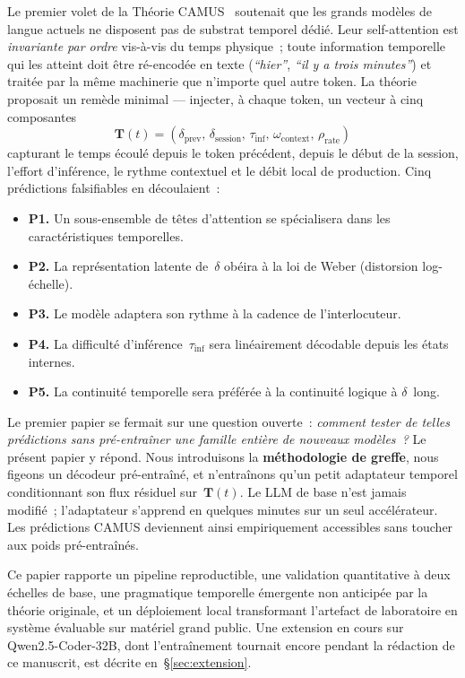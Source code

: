 \documentclass[10pt,twocolumn,letterpaper]{article}
\begin{document}
Le premier volet de la Théorie CAMUS~\cite{camus2026} soutenait que les grands modèles de langue actuels ne disposent pas de substrat temporel dédié. Leur self-attention est \emph{invariante par ordre} vis-à-vis du temps physique~; toute information temporelle qui les atteint doit être ré-encodée en texte (\emph{``hier''}, \emph{``il y a trois minutes''}) et traitée par la même machinerie que n'importe quel autre token. La théorie proposait un remède minimal --- injecter, à chaque token, un vecteur à cinq composantes
\[
\mathbf{T}(t) = (\delta_{\text{prev}},\, \delta_{\text{session}},\, \tau_{\text{inf}},\, \omega_{\text{context}},\, \rho_{\text{rate}})
\]
capturant le temps écoulé depuis le token précédent, depuis le début de la session, l'effort d'inférence, le rythme contextuel et le débit local de production. Cinq prédictions falsifiables en découlaient~:

\begin{itemize}[leftmargin=0.6cm, itemsep=1pt]
    \item \textbf{P1.} Un sous-ensemble de têtes d'attention se spécialisera dans les caractéristiques temporelles.
    \item \textbf{P2.} La représentation latente de~$\delta$ obéira à la loi de Weber (distorsion log-échelle).
    \item \textbf{P3.} Le modèle adaptera son rythme à la cadence de l'interlocuteur.
    \item \textbf{P4.} La difficulté d'inférence~$\tau_{\text{inf}}$ sera linéairement décodable depuis les états internes.
    \item \textbf{P5.} La continuité temporelle sera préférée à la continuité logique à $\delta$~long.
\end{itemize}

Le premier papier se fermait sur une question ouverte~: \emph{comment tester de telles prédictions sans pré-entraîner une famille entière de nouveaux modèles~?} Le présent papier y répond. Nous introduisons la \textbf{méthodologie de greffe}, nous figeons un décodeur pré-entraîné, et n'entraînons qu'un petit adaptateur temporel conditionnant son flux résiduel sur~$\mathbf{T}(t)$. Le LLM de base n'est jamais modifié~; l'adaptateur s'apprend en quelques minutes sur un seul accélérateur. Les prédictions CAMUS deviennent ainsi empiriquement accessibles sans toucher aux poids pré-entraînés.

Ce papier rapporte un pipeline reproductible, une validation quantitative à deux échelles de base, une pragmatique temporelle émergente non anticipée par la théorie originale, et un déploiement local transformant l'artefact de laboratoire en système évaluable sur matériel grand public. Une extension en cours sur Qwen2.5-Coder-32B, dont l'entraînement tournait encore pendant la rédaction de ce manuscrit, est décrite en~\S\ref{sec:extension}.
\end{document}
